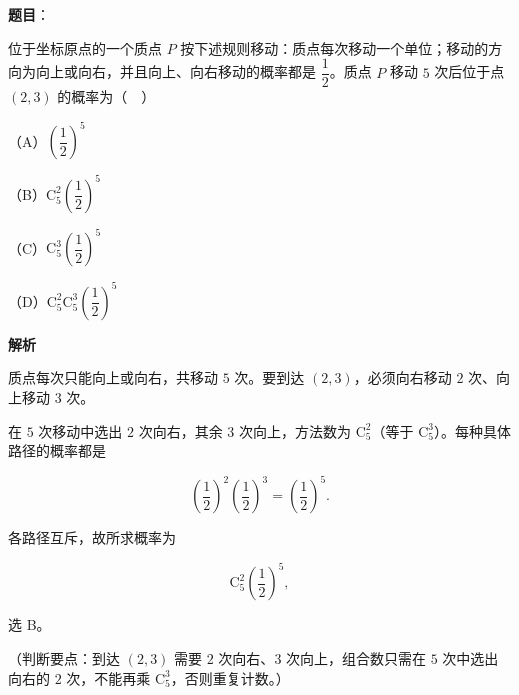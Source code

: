 \begin{answer}

\textbf{题目}：

位于坐标原点的一个质点 $P$ 按下述规则移动：质点每次移动一个单位；移动的方向为向上或向右，并且向上、向右移动的概率都是 $\dfrac12$。质点 $P$ 移动 $5$ 次后位于点 $(2,3)$ 的概率为（　）

（A）$\left(\dfrac12\right)^5$

（B）$\mathrm C_5^2\left(\dfrac12\right)^5$

（C）$\mathrm C_5^3\left(\dfrac12\right)^5$

（D）$\mathrm C_5^2\mathrm C_5^3\left(\dfrac12\right)^5$

\textbf{解析}

质点每次只能向上或向右，共移动 $5$ 次。要到达 $(2,3)$，必须向右移动 $2$ 次、向上移动 $3$ 次。

在 $5$ 次移动中选出 $2$ 次向右，其余 $3$ 次向上，方法数为 $\mathrm C_5^2$（等于 $\mathrm C_5^3$）。每种具体路径的概率都是

\nopagebreak[4]
\[\left(\frac12\right)^2\left(\frac12\right)^3=\left(\frac12\right)^5.\]

各路径互斥，故所求概率为

\nopagebreak[4]
\[\mathrm C_5^2\left(\frac12\right)^5,\]

选 B。

（判断要点：到达 $(2,3)$ 需要 $2$ 次向右、$3$ 次向上，组合数只需在 $5$ 次中选出向右的 $2$ 次，不能再乘 $\mathrm C_5^3$，否则重复计数。）


\end{answer}
